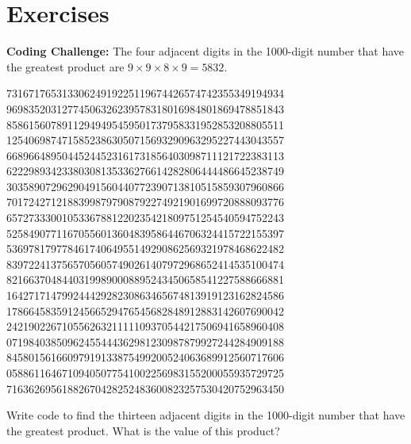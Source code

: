 \section{Exercises}
\begin{problem}
    {\bf Coding Challenge:} The four adjacent digits in the 1000-digit number that have
    the greatest product are $9 \times 9 \times 8 \times 9 = 5832$.

    \begin{center}
    73167176531330624919225119674426574742355349194934\\
    96983520312774506326239578318016984801869478851843\\
    85861560789112949495459501737958331952853208805511\\
    12540698747158523863050715693290963295227443043557\\
    66896648950445244523161731856403098711121722383113\\
    62229893423380308135336276614282806444486645238749\\
    30358907296290491560440772390713810515859307960866\\
    70172427121883998797908792274921901699720888093776\\
    65727333001053367881220235421809751254540594752243\\
    52584907711670556013604839586446706324415722155397\\
    53697817977846174064955149290862569321978468622482\\
    83972241375657056057490261407972968652414535100474\\
    82166370484403199890008895243450658541227588666881\\
    16427171479924442928230863465674813919123162824586\\
    17866458359124566529476545682848912883142607690042\\
    24219022671055626321111109370544217506941658960408\\
    07198403850962455444362981230987879927244284909188\\
    84580156166097919133875499200524063689912560717606\\
    05886116467109405077541002256983155200055935729725\\
    71636269561882670428252483600823257530420752963450
\end{center}

    Write code to find the thirteen adjacent digits in the 1000-digit number that have the
    greatest product. What is the value of this product?
\end{problem}


